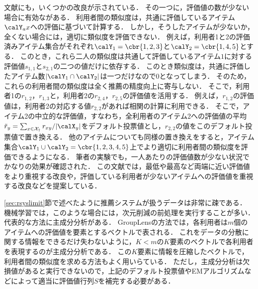 文献\cite{uai:98:01}にも，いくつかの改良が示されている．
その一つに，評価値の数が少ない場合に有効ながある．
利用者間の類似度は，共通に評価しているアイテム$\calY_ax$への評価に基づいて計算する．
しかし，そうしたアイテムが少ないか，全くない場合には，適切に類似度を評価できない．
例えば，利用者1と2の評価済みアイテム集合がそれぞれ$\calY_1=\cbr{1,2,3}$と$\calY_2=\cbr{1,4,5}$とする．
このとき，これら二人の類似度は共通して評価しているアイテム$1$に対する評価値$s_{1,1}$と$s_{2,1}$の二つの値だけに依存する．
このとき類似度は，共通に評価したアイテム数$|\calY_1\cap \calY_2|$は一つだけなので$0$となってしまう．
そのため，これらの利用者間の類似度は全く推薦の精度向上に寄与しない．
そこで，利用者1の$r_{1,2}$，$r_{1,3}$と，利用者2の$r_{2,4}$，$r_{2,5}$の評価値を活用する．
例えば，$r_{1,2}$の評価値は，利用者2の対応する値$r_{2,2}$があれば相関の計算に利用できる．
そこで，アイテム2の中立的な評価値，すなわち，全利用者のアイテム2への評価値の平均$\tilde{r}_y=\sum_{x\in\cal{X}_y} r_{xy}/|\calX_y|$をデフォルト投票値とし，$r_{2,2}$の値をこのデフォルト投票値で置き換える．
他のアイテムについても同様の置き換えをすると，アイテム集合$\calY_1\cup\calY_2=\cbr{1,2,3,4,5}$上でより適切に利用者間の類似度を評価できるようになる．
筆者の実験でも，一人あたりの評価値数が少ない状況でかなりの効果が確認された．
この文献\cite{uai:98:01}では，最低や最高など両端に近い評価値をより重視する改良や，評価している利用者が少ないアイテムへの評価値を重視する改良などを提案している．

\ref{sec:rsyslimit}節で述べたように推薦システムが扱うデータは非常に疎である．
機械学習では，このような場合には，次元削減の前処理を実行することが多い．
代表的な方法に主成分分析\cite{eb:053:00,jpublist:077x,jb:021:00}がある．
GroupLensの方法では，各利用者は$m$個のアイテムへの評価値を要素とするベクトルで表される．
これをデータの分散に関する情報をできるだけ失わないように，$K< m$の$K$要素のベクトルで各利用者を表現するのが主成分分析である．
この$K$要素に情報を圧縮したベクトルで，利用者間の類似度を求める方法もよく用いらている\cite{ec:007,sigir:06:01}．
ただし，主成分分析は欠損値があると実行できないので，上記のデフォルト投票値やEMアルゴリズムなどによって適当に評価値行列$S$を補完する必要がある．

